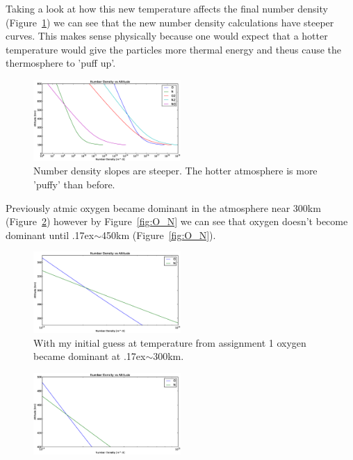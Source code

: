\documentclass[10pt]{article}
\begin{document}
\begin{multicols}{2}
Taking a look at how this new temperature affects the final number density (Figure~\ref{fig:number_density}) we can see that the new number density calculations have steeper curves. This makes sense physically because one would expect that a hotter temperature would give the particles more thermal energy and theus cause the thermosphere to 'puff up'.
\begin{figure}[H]
	\centering
		\includegraphics[width=0.5\textwidth]{./Figures/Number_Density_vs_Altitude_100_800.eps}
	\caption{Number density slopes are steeper. The hotter atmosphere is more 'puffy' than before.}
	\label{fig:number_density}
\end{figure}
Previously atmic oxygen became dominant in the atmosphere near 300km (Figure~\ref{fig:O_N_before}) however by Figure~\ref{fig:O_N} we can see that oxygen doesn't become dominant until \raise.17ex\hbox{$\scriptstyle\sim$}450km (Figure~\ref{fig:O_N}).
\begin{figure}[H]
	\centering
		\includegraphics[width=0.5\textwidth]{./Figures/Number_Density_vs_Altitude_Before.eps}
	\caption{With my initial guess at temperature from assignment 1 oxygen became dominant at \raise.17ex\hbox{$\scriptstyle\sim$}300km.}
	\label{fig:O_N_before}
\end{figure}
\begin{figure}[H]
	\centering
		\includegraphics[width=0.5\textwidth]{./Figures/Number_Density_vs_Altitude_400_500.eps}

\end{figure}
\end{multicols}
\end{document}
